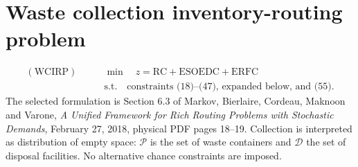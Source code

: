 \documentclass[10pt]{article}
\begin{document}
\section*{Waste collection inventory-routing problem}
\begin{equation}
\begin{aligned}
(\mathrm{WCIRP})\qquad &\min\quad z=\mathrm{RC}+\mathrm{ESOEDC}+\mathrm{ERFC}\\
&\mathrm{s.t.}\quad\text{constraints (18)--(47), expanded below, and (55).}
\end{aligned}\tag{54}
\end{equation}
The selected formulation is Section 6.3 of Markov, Bierlaire, Cordeau, Maknoon and Varone, \emph{A Unified Framework for Rich Routing Problems with Stochastic Demands}, February 27, 2018, physical PDF pages 18--19. Collection is interpreted as distribution of empty space: $\mathcal P$ is the set of waste containers and $\mathcal D$ the set of disposal facilities. No alternative chance constraints are imposed.
\end{document}

